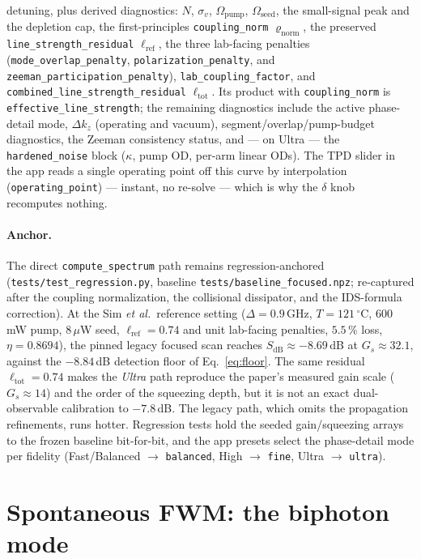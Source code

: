 \documentclass[11pt]{article}
\newcommand{\code}[1]{\texttt{#1}}
\begin{document}
detuning, plus derived diagnostics: $N$, $\sigma_v$, $\Omega_{\text{pump}}$,
$\Omega_{\text{seed}}$, the small-signal peak and the depletion cap, the
first-principles \code{coupling\_norm} $\varrho_{\text{norm}}$, the preserved
\code{line\_strength\_residual} $\ell_{\text{ref}}$, the three lab-facing
penalties (\code{mode\_overlap\_penalty}, \code{polarization\_penalty}, and
\code{zeeman\_participation\_penalty}), \code{lab\_coupling\_factor}, and
\code{combined\_line\_strength\_residual} $\ell_{\text{tot}}$. Its product with
\code{coupling\_norm} is \code{effective\_line\_strength}; the remaining
diagnostics include the active phase-detail mode, $\Delta k_z$
(operating and vacuum), segment/overlap/pump-budget diagnostics, the Zeeman
consistency status, and --- on Ultra --- the \code{hardened\_noise} block
($\kappa$, pump OD, per-arm linear ODs). The TPD slider in the app reads a
single operating point off this curve by interpolation
(\code{operating\_point}) --- instant, no re-solve --- which is why the $\delta$
knob recomputes nothing.

\paragraph{Anchor.} The direct \code{compute\_spectrum} path remains
regression-anchored (\code{tests/test\_regression.py}, baseline
\code{tests/baseline\_focused.npz}; re-captured after the coupling
normalization, the collisional dissipator, and the IDS-formula correction). At
the Sim \emph{et al.}\ reference setting ($\Delta=0.9\,$GHz, $T=121\,^\circ$C,
$600\,$mW pump, $8\,\mu$W seed, $\ell_{\text{ref}}=0.74$ and unit lab-facing
penalties, $5.5\,\%$ loss,
$\eta=0.8694$), the pinned legacy focused scan reaches
$S_{\text{dB}}\approx-8.69\,$dB at $G_s\approx32.1$, against the
$-8.84\,$dB detection floor of Eq.~\eqref{eq:floor}. The same residual
$\ell_{\text{tot}}=0.74$ makes the \emph{Ultra} path reproduce the paper's
measured gain scale ($G_s\approx14$) and the order of the squeezing depth, but it is not an
exact dual-observable calibration to $-7.8\,$dB. The legacy path, which omits
the propagation refinements, runs hotter. Regression tests hold the seeded
gain/squeezing arrays to the frozen
baseline bit-for-bit, and the app presets select the phase-detail mode per
fidelity (Fast/Balanced $\to$ \code{balanced}, High $\to$ \code{fine},
Ultra $\to$ \code{ultra}).

\section{Spontaneous FWM: the biphoton mode}
\end{document}
